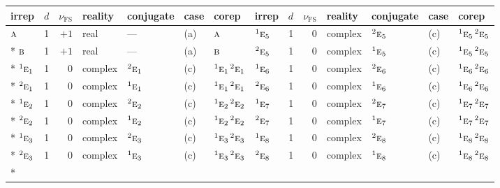 \documentclass[10pt,a4paper]{article}
\numberwithin{equation}{section}
\newcommand{\irr}[1]{\text{\normalfont\scshape #1}}
\newcommand{\conjpair}[1]{{}^{#1}}
\newcommand{\fsind}{\nu_{\mathrm{FS}}}
\begin{document}
{\small\renewcommand{\arraystretch}{1.25}\setlength{\tabcolsep}{4pt}\begin{longtable}{@{}lrrllll@{\hspace{18pt}}lrrllll@{}}\toprule
irrep & $d$ & $\fsind$ & reality & conjugate & case & corep & irrep & $d$ & $\fsind$ & reality & conjugate & case & corep\\\midrule\endhead
\bottomrule\endfoot\endlastfoot
$\irr{a}$ & 1 & $+1$ & real & --- & (a) & $\irr{a}$ & $\conjpair{1}\irr{e}_{5}$ & 1 & $0$ & complex & $\conjpair{2}\irr{e}_{5}$ & (c) & $\conjpair{1}\irr{e}_{5}\,\conjpair{2}\irr{e}_{5}$\\*
$\irr{b}$ & 1 & $+1$ & real & --- & (a) & $\irr{b}$ & $\conjpair{2}\irr{e}_{5}$ & 1 & $0$ & complex & $\conjpair{1}\irr{e}_{5}$ & (c) & $\conjpair{1}\irr{e}_{5}\,\conjpair{2}\irr{e}_{5}$\\*
$\conjpair{1}\irr{e}_{1}$ & 1 & $0$ & complex & $\conjpair{2}\irr{e}_{1}$ & (c) & $\conjpair{1}\irr{e}_{1}\,\conjpair{2}\irr{e}_{1}$ & $\conjpair{1}\irr{e}_{6}$ & 1 & $0$ & complex & $\conjpair{2}\irr{e}_{6}$ & (c) & $\conjpair{1}\irr{e}_{6}\,\conjpair{2}\irr{e}_{6}$\\*
$\conjpair{2}\irr{e}_{1}$ & 1 & $0$ & complex & $\conjpair{1}\irr{e}_{1}$ & (c) & $\conjpair{1}\irr{e}_{1}\,\conjpair{2}\irr{e}_{1}$ & $\conjpair{2}\irr{e}_{6}$ & 1 & $0$ & complex & $\conjpair{1}\irr{e}_{6}$ & (c) & $\conjpair{1}\irr{e}_{6}\,\conjpair{2}\irr{e}_{6}$\\*
$\conjpair{1}\irr{e}_{2}$ & 1 & $0$ & complex & $\conjpair{2}\irr{e}_{2}$ & (c) & $\conjpair{1}\irr{e}_{2}\,\conjpair{2}\irr{e}_{2}$ & $\conjpair{1}\irr{e}_{7}$ & 1 & $0$ & complex & $\conjpair{2}\irr{e}_{7}$ & (c) & $\conjpair{1}\irr{e}_{7}\,\conjpair{2}\irr{e}_{7}$\\*
$\conjpair{2}\irr{e}_{2}$ & 1 & $0$ & complex & $\conjpair{1}\irr{e}_{2}$ & (c) & $\conjpair{1}\irr{e}_{2}\,\conjpair{2}\irr{e}_{2}$ & $\conjpair{2}\irr{e}_{7}$ & 1 & $0$ & complex & $\conjpair{1}\irr{e}_{7}$ & (c) & $\conjpair{1}\irr{e}_{7}\,\conjpair{2}\irr{e}_{7}$\\*
$\conjpair{1}\irr{e}_{3}$ & 1 & $0$ & complex & $\conjpair{2}\irr{e}_{3}$ & (c) & $\conjpair{1}\irr{e}_{3}\,\conjpair{2}\irr{e}_{3}$ & $\conjpair{1}\irr{e}_{8}$ & 1 & $0$ & complex & $\conjpair{2}\irr{e}_{8}$ & (c) & $\conjpair{1}\irr{e}_{8}\,\conjpair{2}\irr{e}_{8}$\\*
$\conjpair{2}\irr{e}_{3}$ & 1 & $0$ & complex & $\conjpair{1}\irr{e}_{3}$ & (c) & $\conjpair{1}\irr{e}_{3}\,\conjpair{2}\irr{e}_{3}$ & $\conjpair{2}\irr{e}_{8}$ & 1 & $0$ & complex & $\conjpair{1}\irr{e}_{8}$ & (c) & $\conjpair{1}\irr{e}_{8}\,\conjpair{2}\irr{e}_{8}$\\*

\end{longtable}}
\end{document}
